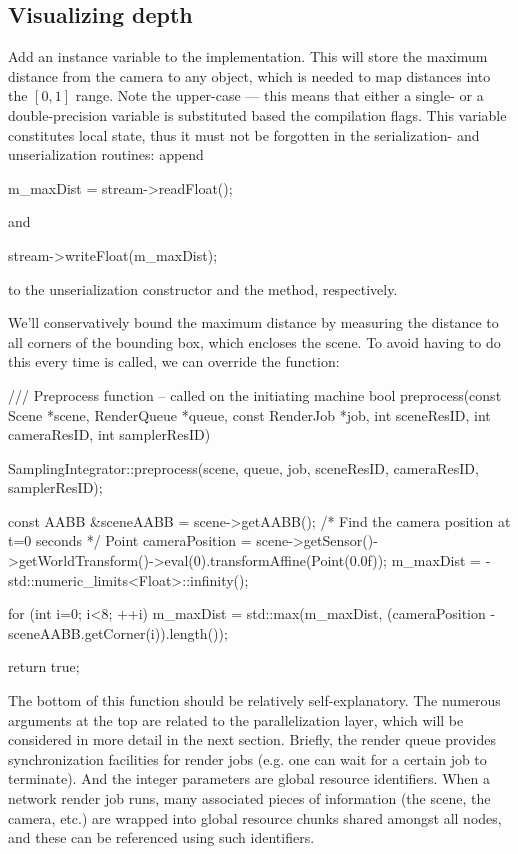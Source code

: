 \subsection{Visualizing depth}
Add an instance variable  to the implementation. This
will store the maximum distance from the camera to any object, which is needed
to map distances into the $[0,1]$ range. Note the upper-case  ---
this means that either a single- or a double-precision variable is
substituted based the compilation flags. This variable constitutes local
state, thus it must not be forgotten in the serialization- and unserialization routines:
append
\begin{cpp}
    m_maxDist = stream->readFloat();
\end{cpp}
and
\begin{cpp}
    stream->writeFloat(m_maxDist);
\end{cpp}
to the unserialization constructor and the  method, respectively.

We'll conservatively bound the maximum distance by measuring the
distance to all corners of the bounding box, which encloses the scene.
To avoid having to do this every time  is called,
we can override the  function:
\begin{cpp}
    /// Preprocess function -- called on the initiating machine
    bool preprocess(const Scene *scene, RenderQueue *queue,
            const RenderJob *job, int sceneResID, int cameraResID,
            int samplerResID) {
        SamplingIntegrator::preprocess(scene, queue, job, sceneResID,
            cameraResID, samplerResID);

        const AABB &sceneAABB = scene->getAABB();
    /* Find the camera position at t=0 seconds */
        Point cameraPosition = scene->getSensor()->getWorldTransform()->eval(0).transformAffine(Point(0.0f));
        m_maxDist = - std::numeric_limits<Float>::infinity();

        for (int i=0; i<8; ++i)
            m_maxDist = std::max(m_maxDist,
                (cameraPosition - sceneAABB.getCorner(i)).length());

        return true;
    }
\end{cpp}
The bottom of this function should be relatively self-explanatory. The
numerous arguments at the top are related to the parallelization layer, which will be
considered in more detail in the next section. Briefly, the render queue
provides synchronization facilities for render jobs (e.g. one can wait
for a certain job to terminate). And the integer parameters are
global resource identifiers. When a network render job runs, many associated
pieces of information (the scene, the camera, etc.) are wrapped into global resource chunks
shared amongst all nodes, and these can be referenced using such identifiers.

